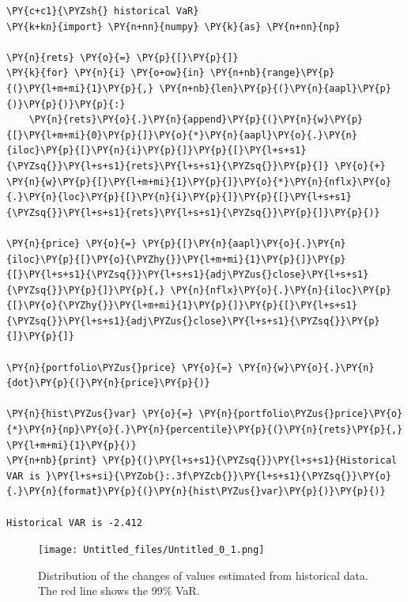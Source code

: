 \begin{tcolorbox}[breakable, size=fbox, boxrule=1pt, pad at break*=1mm,colback=cellbackground, colframe=cellborder]
\begin{Verbatim}[commandchars=\\\{\}]
\PY{c+c1}{\PYZsh{} historical VaR}
\PY{k+kn}{import} \PY{n+nn}{numpy} \PY{k}{as} \PY{n+nn}{np}
				
\PY{n}{rets} \PY{o}{=} \PY{p}{[}\PY{p}{]}
\PY{k}{for} \PY{n}{i} \PY{o+ow}{in} \PY{n+nb}{range}\PY{p}{(}\PY{l+m+mi}{1}\PY{p}{,} \PY{n+nb}{len}\PY{p}{(}\PY{n}{aapl}\PY{p}{)}\PY{p}{)}\PY{p}{:}
    \PY{n}{rets}\PY{o}{.}\PY{n}{append}\PY{p}{(}\PY{n}{w}\PY{p}{[}\PY{l+m+mi}{0}\PY{p}{]}\PY{o}{*}\PY{n}{aapl}\PY{o}{.}\PY{n}{iloc}\PY{p}{[}\PY{n}{i}\PY{p}{]}\PY{p}{[}\PY{l+s+s1}{\PYZsq{}}\PY{l+s+s1}{rets}\PY{l+s+s1}{\PYZsq{}}\PY{p}{]} \PY{o}{+} \PY{n}{w}\PY{p}{[}\PY{l+m+mi}{1}\PY{p}{]}\PY{o}{*}\PY{n}{nflx}\PY{o}{.}\PY{n}{loc}\PY{p}{[}\PY{n}{i}\PY{p}{]}\PY{p}{[}\PY{l+s+s1}{\PYZsq{}}\PY{l+s+s1}{rets}\PY{l+s+s1}{\PYZsq{}}\PY{p}{]}\PY{p}{)}
		
\PY{n}{price} \PY{o}{=} \PY{p}{[}\PY{n}{aapl}\PY{o}{.}\PY{n}{iloc}\PY{p}{[}\PY{o}{\PYZhy{}}\PY{l+m+mi}{1}\PY{p}{]}\PY{p}{[}\PY{l+s+s1}{\PYZsq{}}\PY{l+s+s1}{adj\PYZus{}close}\PY{l+s+s1}{\PYZsq{}}\PY{p}{]}\PY{p}{,} \PY{n}{nflx}\PY{o}{.}\PY{n}{iloc}\PY{p}{[}\PY{o}{\PYZhy{}}\PY{l+m+mi}{1}\PY{p}{]}\PY{p}{[}\PY{l+s+s1}{\PYZsq{}}\PY{l+s+s1}{adj\PYZus{}close}\PY{l+s+s1}{\PYZsq{}}\PY{p}{]}\PY{p}{]}
		
\PY{n}{portfolio\PYZus{}price} \PY{o}{=} \PY{n}{w}\PY{o}{.}\PY{n}{dot}\PY{p}{(}\PY{n}{price}\PY{p}{)}
		
\PY{n}{hist\PYZus{}var} \PY{o}{=} \PY{n}{portfolio\PYZus{}price}\PY{o}{*}\PY{n}{np}\PY{o}{.}\PY{n}{percentile}\PY{p}{(}\PY{n}{rets}\PY{p}{,} \PY{l+m+mi}{1}\PY{p}{)}
\PY{n+nb}{print} \PY{p}{(}\PY{l+s+s1}{\PYZsq{}}\PY{l+s+s1}{Historical VAR is }\PY{l+s+si}{\PYZob{}:.3f\PYZcb{}}\PY{l+s+s1}{\PYZsq{}}\PY{o}{.}\PY{n}{format}\PY{p}{(}\PY{n}{hist\PYZus{}var}\PY{p}{)}\PY{p}{)}

Historical VAR is -2.412
\end{Verbatim}
\end{tcolorbox}

\begin{figure}
	\centering
	\texttt{[image: Untitled\_files/Untitled\_0\_1.png]}
	\caption{Distribution of the changes of values estimated from historical data. The red line shows the 99\% VaR.}
	\label{fig:hist_var}
\end{figure}

